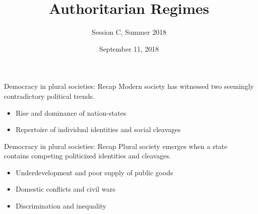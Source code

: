 \documentclass[10pt]{beamer}
\title{Authoritarian Regimes}
\author{Session C, Summer 2018}
\date{September 11, 2018}
\begin{document}
\maketitle

\begin{frame}{Democracy in plural societies: Recap}
	Modern society has witnessed two seemingly contradictory political trends.
	\vspace{0.2cm}
	\begin{itemize}
	\item Rise and dominance of nation-states
	\item Repertoire of individual identities and social cleavages
	\end{itemize}
\end{frame}

\begin{frame}{Democracy in plural societies: Recap}
	Plural society emerges when a state	contains competing politicized identities and cleavages.
	\vspace{0.2cm}
	\begin{itemize}
	\item Underdevelopment and poor supply of public goods
	\item Domestic conflicts and civil wars
	\item Discrimination and inequality
	\end{itemize}
\end{frame}
\end{document}

